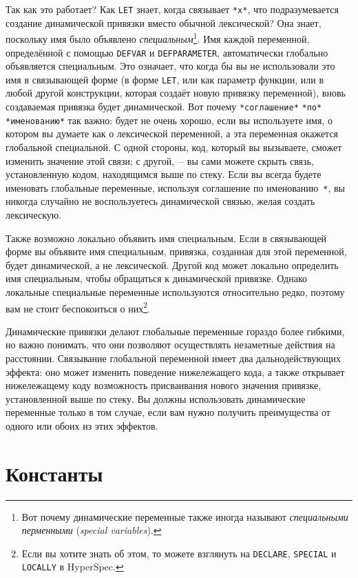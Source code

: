 Так как это работает? Как \lstinline{LET} знает, когда связывает \lstinline{*x*}, что
подразумевается создание динамической привязки вместо обычной лексической? Она знает,
поскольку имя было объявлено \textit{специальным}\footnote{Вот почему динамические
  переменные также иногда называют \textit{специальными перменными} (\textit{special
    variables}).}. Имя каждой переменной, определённой с по\-мощью \lstinline{DEFVAR} и
\lstinline{DEFPARAMETER}, автоматически глобально объявляется спе\-циаль\-ным. Это означает,
что когда бы вы не использовали это имя в связывающей форме (в форме \lstinline{LET}, или
как параметр функции, или в любой другой конструкции, которая создаёт новую привязку
переменной), вновь создаваемая привязка будет динамической. Вот почему \lstinline{*соглашение*}
\lstinline{*по*} \lstinline{*именованию*} так важно: будет не очень хорошо, если вы используете имя,
о котором вы думаете как о лексической переменной, а эта переменная окажется глобальной
специальной. С одной стороны, код, который вы вызываете, сможет изменить значение этой
связи; с другой,~-- вы сами можете скрыть связь, установленную кодом, находящимся выше по
стеку. Если вы всегда будете именовать глобальные переменные, используя соглашение по
именованию~\lstinline{*}, вы никогда случайно не воспользуетесь динамической связью, желая создать
лексическую.

Также возможно локально объявить имя специальным. Если в связывающей форме вы объявите имя
специальным, привязка, созданная для этой переменной, будет динамической, а не
лексической. Другой код может локально определить имя специальным, чтобы обращаться к
динамической привязке. Однако локальные специальные переменные используются относительно
редко, поэтому вам не стоит беспокоиться о них\footnote{Если вы хотите знать об этом, то
  можете взглянуть на \lstinline{DECLARE}, \lstinline{SPECIAL} и \lstinline{LOCALLY} в HyperSpec.}.

Динамические привязки делают глобальные переменные гораздо более гибкими, но важно понимать,
что они позволяют осуществлять незаметные действия на расстоянии. Связывание глобальной
переменной имеет два дальнодействующих эффекта: оно может изменить поведение нижележащего кода,
а также открывает нижележащему коду возможность присваивания нового значения привязке,
установленной выше по стеку. Вы должны использовать динамические переменные только в том
случае, если вам нужно получить преимущества от одного или обоих из этих эффектов.

\section{Константы}

